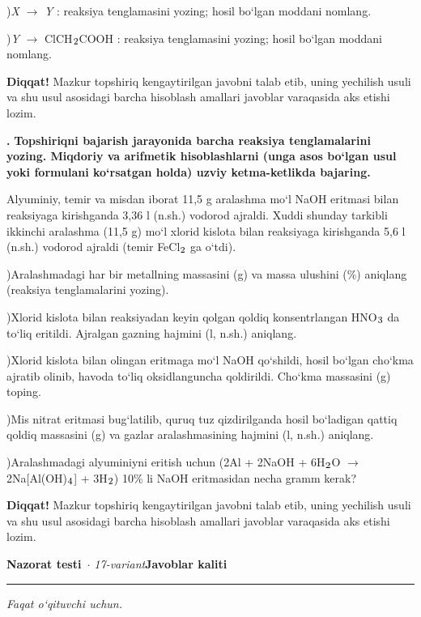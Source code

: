 \documentclass[11pt,a4paper]{article}
\renewcommand{\textsubscript}[1]{\ensuremath{_{\text{\fontsize{8}{8}\selectfont #1}}}}
\newcommand{\qn}[1]{\textbf{\fontsize{11.5}{13}\selectfont #1}}
\newcommand{\qsep}{\par\vspace{1pt}\noindent\rule{0pt}{0.4pt}\par\vspace{5pt}}
\newcommand{\diqqat}[1]{\par\smallskip\noindent\textbf{Diqqat!} #1\par\medskip}
\begin{document}
)\textit{X} $\to$ \textit{Y} : reaksiya tenglamasini yozing; hosil bo`lgan moddani nomlang.\par
{})\textit{Y} $\to$ ClCH\textsubscript{2}COOH : reaksiya tenglamasini yozing; hosil bo`lgan moddani nomlang.\par
\diqqat{Mazkur topshiriq kengaytirilgan javobni talab etib, uning yechilish usuli va shu usul asosidagi barcha hisoblash amallari javoblar varaqasida aks etishi lozim.}\qsep
\noindent\qn{43.} \textbf{Topshiriqni bajarish jarayonida barcha reaksiya tenglamalarini yozing. Miqdoriy va arifmetik hisoblashlarni (unga asos bo`lgan usul yoki formulani ko`rsatgan holda) uzviy ketma-ketlikda bajaring.}\par\smallskip
Alyuminiy, temir va misdan iborat 11,5 g aralashma mo`l NaOH eritmasi bilan reaksiyaga kirishganda 3,36 l (n.sh.) vodorod ajraldi. Xuddi shunday tarkibli ikkinchi aralashma (11,5 g) mo`l xlorid kislota bilan reaksiyaga kirishganda 5,6 l (n.sh.) vodorod ajraldi (temir FeCl\textsubscript{2} ga o`tdi).\par
{})Aralashmadagi har bir metallning massasini (g) va massa ulushini (\%) aniqlang (reaksiya tenglamalarini yozing).\par
{})Xlorid kislota bilan reaksiyadan keyin qolgan qoldiq konsentrlangan HNO\textsubscript{3} da to`liq eritildi. Ajralgan gazning hajmini (l, n.sh.) aniqlang.\par
{})Xlorid kislota bilan olingan eritmaga mo`l NaOH qo`shildi, hosil bo`lgan cho`kma ajratib olinib, havoda to`liq oksidlanguncha qoldirildi. Cho`kma massasini (g) toping.\par
{})Mis nitrat eritmasi bug`latilib, quruq tuz qizdirilganda hosil bo`ladigan qattiq qoldiq massasini (g) va gazlar aralashmasining hajmini (l, n.sh.) aniqlang.\par
{})Aralashmadagi alyuminiyni eritish uchun (2Al + 2NaOH + 6H\textsubscript{2}O $\to$ 2Na[Al(OH)\textsubscript{4}] + 3H\textsubscript{2}) 10\% li NaOH eritmasidan necha gramm kerak?\par
\diqqat{Mazkur topshiriq kengaytirilgan javobni talab etib, uning yechilish usuli va shu usul asosidagi barcha hisoblash amallari javoblar varaqasida aks etishi lozim.}\qsep
\newpage
\noindent\textbf{\fontsize{13}{15}\selectfont Nazorat testi}\ \textit{$\cdot$ 17-variant}\hfill \textbf{Javoblar kaliti}\par\smallskip\hrule\smallskip
\textit{Faqat o`qituvchi uchun.}\par\medskip
\end{document}

